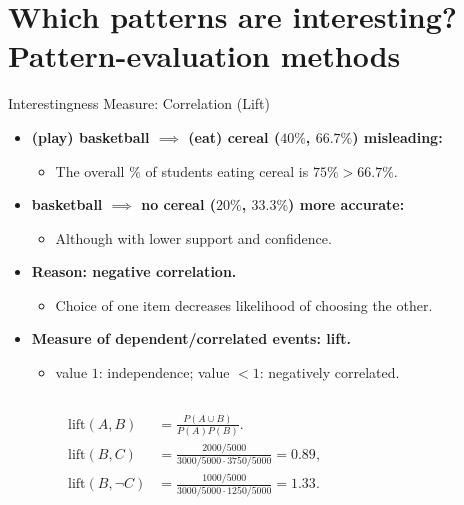 \section{Which patterns are interesting? Pattern-evaluation methods}

\begin{frame}{Interestingness Measure: Correlation (Lift)}
	\begin{itemize}
		\item \textbf{(play) basketball $\implies$ (eat) cereal 
			($40\%$, $66.7\%$)  misleading:}
		\begin{itemize}
			\item The overall $\%$ of students eating cereal is $75\% > 
			66.7\%$.
		\end{itemize}
		\item \textbf{basketball $\implies$ no cereal ($20\%$, 
			$33.3\%$)  more accurate:}
		\begin{itemize}
			\item Although with lower support and confidence.
		\end{itemize}
		\item \textbf{Reason: negative correlation.}
		\begin{itemize}
			\item Choice of one item decreases likelihood of choosing 
			the other.
		\end{itemize}
		\item \textbf{Measure of dependent/correlated events: lift.}
		\begin{itemize}
			\item value $1$: independence; value $< 1$: negatively 
			correlated.
		\end{itemize}
	\end{itemize}
	\begin{columns}
		\begin{column}{0.6\textwidth}
			\vspace{-1cm}
			\begin{align}
				\text{lift}(A,B)      & = \frac{P(A \cup B)}{P(A) P(B)}.   \\
				\text{lift}(B,C)      & = \frac{2000/5000}{3000/5000 \cdot 
					3750 / 5000} = 0.89,\\
				\text{lift}(B,\neg C) & = \frac{1000 / 5000}{3000 / 5000   
					\cdot 1250 / 5000} =1.33.
			\end{align}
		\end{column}
		\begin{column}{0.3\textwidth}
		\end{column}
	\end{columns}
\end{frame}

